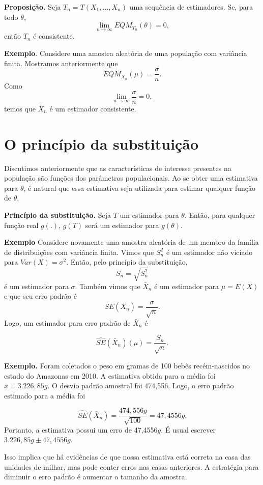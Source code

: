 \documentclass[
  letterpaper,
  DIV=11,
  numbers=noendperiod]{scrartcl}
\begin{document}
\textbf{Proposição.} Seja \(T_n=T(X_1,\ldots,X_n)\) uma sequência de
estimadores. Se, para todo \(\theta\),
\[\lim_{n\rightarrow\infty}EQM_{T_n}(\theta)=0,\] então \(T_n\) é
consistente.

\textbf{Exemplo}. Considere uma amostra aleatória de uma população com
variância finita. Mostramos anteriormente que
\[EQM_{\bar{X}_n}(\mu)=\frac{\sigma}{n}.\] Como
\[\lim_{n\rightarrow\infty}\frac{\sigma}{n}=0,\] temos que \(\bar{X}_n\)
é um estimador consistente.

\section{O princípio da
substituição}\label{o-princuxedpio-da-substituiuxe7uxe3o}

Discutimos anteriormente que as características de interesse presentes
na população são funções dos parâmetros populacionais. Ao se obter uma
estimativa para \(\theta\), é natural que essa estimativa seja utilizada
para estimar qualquer função de \(\theta\).

\textbf{Princípio da substituição.} Seja \(T\) um estimador para
\(\theta\). Então, para qualquer função real \(g(.)\), \(g(T)\) será um
estimador para \(g(\theta)\).

\textbf{Exemplo} Considere novamente uma amostra aleatória de um membro
da família de distribuições com variância finita. Vimos que \(S^2_n\) é
um estimador não viciado para \(Var(X)=\sigma^2\). Então, pelo princípio
da substituição, \[S_n=\sqrt{S^2_n}\] é um estimador para \(\sigma\).
Também vimos que \(\bar{X}_n\) é um estimador para \(\mu=E(X)\) e que
seu erro padrão é \[SE(\bar{X}_n)=\frac{\sigma}{\sqrt{n}}.\] Logo, um
estimador para erro padrão de \(\bar{X}_n\) é

\[\widehat{SE}(\bar{X}_n)(\mu)=\frac{S_n}{\sqrt{n}}.\]

\textbf{Exemplo.} Foram coletados o peso em gramas de 100 bebês
recém-nascidos no estado do Amazonas em 2010. A estimativa obtida para a
média foi \(\bar{x}=3.226,85 g\). O desvio padrão amostral foi 474,556.
Logo, o erro padrão estimado para a média foi

\[\hat{SE}(\bar{X}_n)=\frac{474,556g}{\sqrt{100}}=47,4556g.\] Portanto,
a estimativa possui um erro de 47,4556\(g\). É usual escrever
\(3.226,85g\pm47,4556g\).

Isso implica que há evidências de que nossa estimativa está correta na
casa das unidades de milhar, mas pode conter erros nas casas anteriores.
A estratégia para diminuir o erro padrão é aumentar o tamanho da
amostra.
\end{document}
